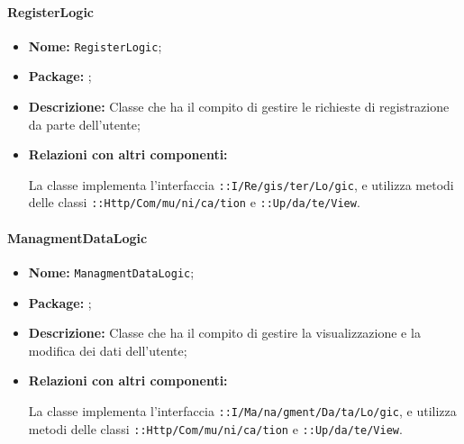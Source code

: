 \paragraph{RegisterLogic}
\begin{flushleft}
\begin{itemize}
\item \textbf{Nome:} \texttt{RegisterLogic};
\item \textbf{Package:} \texttt{\logicUser{}};
\item \textbf{Descrizione:} Classe che ha il compito di gestire le richieste di registrazione da parte dell'utente;
\item \textbf{Relazioni con altri componenti:}
\begin{sloppypar}
La classe implementa l'interfaccia \texttt{\iLogicUser{}::I\fshyp{}Re\fshyp{}gis\fshyp{}ter\fshyp{}Lo\fshyp{}gic}, e utilizza metodi delle classi \texttt{\serverCommunication{}::Http\fshyp{}Com\fshyp{}mu\fshyp{}ni\fshyp{}ca\fshyp{}tion} e \texttt{\logicUser{}::Up\fshyp{}da\fshyp{}te\fshyp{}View}.
\end{sloppypar}
\end{itemize}
\end{flushleft}

\paragraph{ManagmentDataLogic}
\begin{flushleft}
\begin{itemize}
\item \textbf{Nome:} \texttt{ManagmentDataLogic};
\item \textbf{Package:} \texttt{\logicUser{}};
\item \textbf{Descrizione:} Classe che ha il compito di gestire la visualizzazione e la modifica dei dati dell'utente;
\item \textbf{Relazioni con altri componenti:}
\begin{sloppypar}
La classe implementa l'interfaccia \texttt{\iLogicUser{}::I\fshyp{}Ma\fshyp{}na\fshyp{}gment\fshyp{}Da\fshyp{}ta\fshyp{}Lo\fshyp{}gic}, e utilizza metodi delle classi \texttt{\serverCommunication{}::Http\fshyp{}Com\fshyp{}mu\fshyp{}ni\fshyp{}ca\fshyp{}tion} e \texttt{\logicUser{}::Up\fshyp{}da\fshyp{}te\fshyp{}View}.
\end{sloppypar}
\end{itemize}
\end{flushleft}

